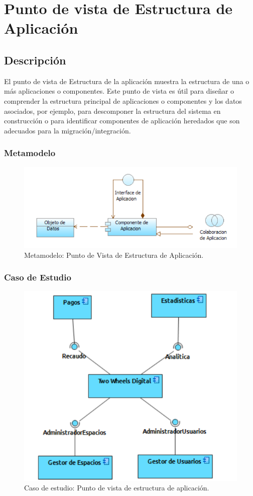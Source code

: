 \section{Punto de vista de Estructura de Aplicación}
\subsection{Descripción}
El punto de vista de Estructura de la aplicación muestra la estructura de una o más aplicaciones
o componentes. Este punto de vista es útil para diseñar o comprender la estructura principal de
aplicaciones o componentes y los datos asociados, por ejemplo, para descomponer la estructura del
sistema en construcción o para identificar componentes de aplicación heredados que son adecuados
para la migración/integración.

\subsubsection{Metamodelo}
\begin{figure}[H]
	\centering
	\includegraphics[width=1.0\textwidth]{imagenes/Metamodelos/Aplicacion/meta_estructura_aplicacion.png}
	\caption{Metamodelo: Punto de Vista de Estructura de Aplicación.}
	\label{fig:gap_analysis}
\end{figure}

\subsubsection{Caso de Estudio}

\begin{figure}[H]
	\centering
	\includegraphics[width=1.0\textwidth]{imagenes/Caso_Estudio/Aplicacion/EstAplicacion.PDF}
	\caption{Caso de estudio: Punto de vista de estructura de aplicación.}
	\label{fig:gap_analysis}
\end{figure}
